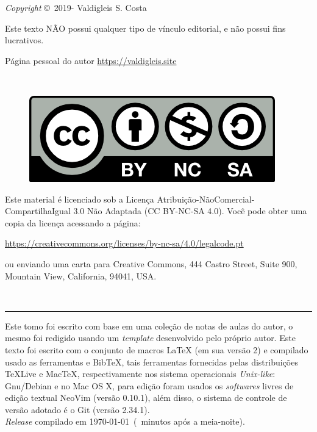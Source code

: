 \begingroup

\newpage
\thispagestyle{empty}





\noindent \textit{Copyright} \copyright\ 2019-{\the\year} Valdigleis S. Costa

\noindent Este texto  \textsc{NÃO}  possui qualquer tipo de vínculo editorial, e não possui fins lucrativos.

\noindent Página pessoal do autor \url{https://valdigleis.site}

~\vfill

\thispagestyle{empty}

\begin{figure}[h]
	\centering
	\includegraphics[width=0.15\linewidth]{fig/license}
\end{figure}
\noindent Este material é licenciado sob a Licença Atribuição-NãoComercial-CompartilhaIgual 3.0 Não Adaptada (CC BY-NC-SA 4.0).  Você pode obter uma copia da licença acessando a página: 
\begin{center}
	\url{https://creativecommons.org/licenses/by-nc-sa/4.0/legalcode.pt}
\end{center}
\noindent ou enviando uma carta para Creative Commons, 444 Castro Street, Suite 900, Mountain View, California, 94041, USA.

~\vfill

\hrule
\vspace*{1cm}

\noindent Este tomo foi escrito com base em uma coleção de notas de aulas do autor, o mesmo foi redigido usando um \textit{template} desenvolvido pelo próprio autor. Este texto foi escrito com o conjunto de macros {\LaTeX} ({\color{NordAurora1}em sua versão 2}) e compilado usado as ferramentas {\LuaLaTeX} e {Bib\TeX}, tais ferramentas fornecidas pelas distribuições {\TeX}Live e Mac{\TeX}, respectivamente  nos sistema operacionais \textit{Unix-like}: Gnu/Debian e no Mac OS X, para edição foram usados os \textit{softwares} livres  de edição textual NeoVim ({\color{NordAurora1}versão 0.10.1}), além disso, o sistema de controle de versão adotado é o Git ({\color{NordAurora1}versão 2.34.1}). \\ 

\noindent \textit{Release} compilado em \today\ (\MinutesAfterMidnight\ minutos após a meia-noite). %

\endgroup
